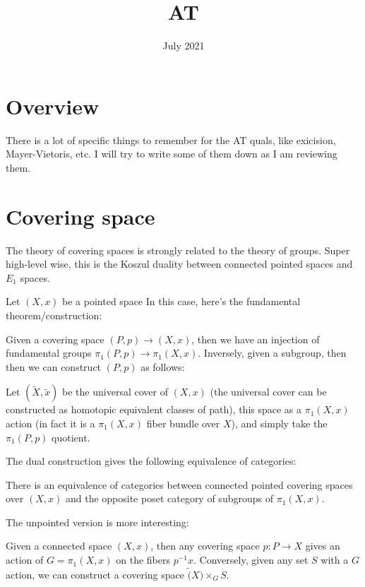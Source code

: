 \documentclass[main.tex]{subfiles}
\title{AT}
\date{July 2021}
\begin{document}
\maketitle

\section{Overview}
There is a lot of specific things to remember for the AT quals, like exicision, Mayer-Vietoris, etc. I will try to write some of them down as I am reviewing them.

\section{Covering space}
The theory of covering spaces is strongly related to the theory of groups. Super high-level wise, this is the Koszul duality between connected pointed spaces and $E_1$ spaces.

Let $(X,x)$ be a pointed space
In this case, here's the fundamental theorem/construction:

\begin{construction}
Given a covering space $(P, p) \rightarrow (X,x)$, then we have an injection of fundamental groups $\pi_1 (P, p) \rightarrow \pi_1 (X,x)$. Inversely, given a subgroup, then then we can construct $(P, p)$ as follows:

Let $(\tilde{X}, \tilde{x})$ be the universal cover of $(X,x)$ (the universal cover can be constructed as homotopic equivalent classes of path), this space as a $\pi_1(X,x)$ action (in fact it is a $\pi_1(X,x)$ fiber bundle over $X$), and simply take the $\pi_1(P, p)$ quotient.
\end{construction}

The dual construction gives the following equivalence of categories:
\begin{theorem}
There is an equivalence of categories between connected pointed covering spaces over $(X, x)$ and the opposite poset category of subgroups of $\pi_1(X,x)$.
\end{theorem}

The unpointed version is more interesting:
\begin{construction}
Given a connected space $(X,x)$, then any covering space $p: P \rightarrow X$ gives an action of $G = \pi_1(X,x)$ on the fibers $p^{-1} x$. Conversely, given any set $S$ with a $G$ action, we can construct a covering space $\tilde(X) \times_G S$. 
\end{construction}
\end{document}
